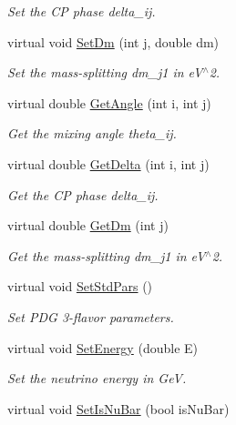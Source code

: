 \begin{DoxyCompactItemize}
\begin{DoxyCompactList}\small\item\em Set the CP phase delta\+\_\+ij. \end{DoxyCompactList}\item 
virtual void \hyperlink{classOscProb_1_1PMNS__Base_a492243b22fb1b783cd2943f507cff970}{Set\+Dm} (int j, double dm)
\begin{DoxyCompactList}\small\item\em Set the mass-\/splitting dm\+\_\+j1 in e\+V$^\wedge$2. \end{DoxyCompactList}\item 
virtual double \hyperlink{classOscProb_1_1PMNS__Base_acee137091304c919642293ddf015bbc8}{Get\+Angle} (int i, int j)
\begin{DoxyCompactList}\small\item\em Get the mixing angle theta\+\_\+ij. \end{DoxyCompactList}\item 
virtual double \hyperlink{classOscProb_1_1PMNS__Base_adb8dbc91d4286d2e7c8f768c59476241}{Get\+Delta} (int i, int j)
\begin{DoxyCompactList}\small\item\em Get the CP phase delta\+\_\+ij. \end{DoxyCompactList}\item 
virtual double \hyperlink{classOscProb_1_1PMNS__Base_ad26815ac5f4805d1259817e4936e5f8f}{Get\+Dm} (int j)
\begin{DoxyCompactList}\small\item\em Get the mass-\/splitting dm\+\_\+j1 in e\+V$^\wedge$2. \end{DoxyCompactList}\item 
virtual void \hyperlink{classOscProb_1_1PMNS__Base_a4de96ac9b6d1e9b029ab877e57d211ad}{Set\+Std\+Pars} ()
\begin{DoxyCompactList}\small\item\em Set P\+DG 3-\/flavor parameters. \end{DoxyCompactList}\item 
virtual void \hyperlink{classOscProb_1_1PMNS__Base_a95b3b0d0cab5e6a54b5ef99587f837c0}{Set\+Energy} (double E)
\begin{DoxyCompactList}\small\item\em Set the neutrino energy in GeV. \end{DoxyCompactList}\item 
virtual void \hyperlink{classOscProb_1_1PMNS__Base_a717e0348cf762f3961854e332a9b52e0}{Set\+Is\+Nu\+Bar} (bool is\+Nu\+Bar)

\end{DoxyCompactItemize}
